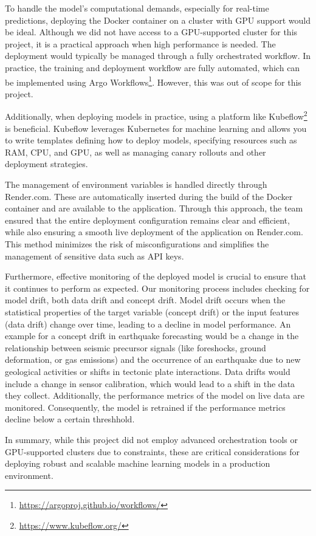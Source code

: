 To handle the model's computational demands, especially for real-time
predictions, deploying the Docker container on a cluster with GPU support
would be ideal. Although we did not have access to a GPU-supported cluster
for this project, it is a practical approach when high performance is needed.
The deployment would typically be managed through a fully orchestrated workflow.
In practice, the training and deployment workflow are fully automated,
which can be implemented using Argo Workflows\footnote{\url{https://argoproj.github.io/workflows/}}.
However, this was out of scope for this project.

Additionally, when deploying models in practice, using a platform like
Kubeflow\footnote{\url{https://www.kubeflow.org/}} is beneficial. Kubeflow
leverages Kubernetes for machine learning and allows you to write templates
defining how to deploy models, specifying resources such as RAM, CPU, and GPU,
as well as managing canary rollouts and other deployment strategies.

The management of environment variables is handled directly through Render.com.
These are automatically inserted during the build of the Docker container and
are available to the application. Through this approach, the team ensured that
the entire deployment configuration remains clear and efficient, while also
ensuring a smooth live deployment of the application on Render.com. This
method minimizes the risk of misconfigurations and simplifies the management
of sensitive data such as API keys.

Furthermore, effective monitoring of the deployed model is crucial to ensure
that it continues to perform as expected. Our monitoring process includes
checking for model drift, both data drift and concept drift. Model drift occurs
when the statistical properties of the target variable (concept drift) or the
input features (data drift) change over time, leading to a decline in model
performance. An example for a concept drift in earthquake forecasting would
be a change in the relationship between seismic precursor signals
(like foreshocks, ground deformation, or gas emissions) and the occurrence
of an earthquake due to new geological activities or shifts in tectonic plate
interactions. Data drifts would include a change in sensor calibration, which
would lead to a shift in the data they collect. Additionally, the performance
metrics of the model on live data are monitored. Consequently, the model is
retrained if the performance metrics decline below a certain threshhold.

In summary, while this project did not employ advanced orchestration tools
or GPU-supported clusters due to constraints, these are critical considerations
for deploying robust and scalable machine learning models in a production environment.
